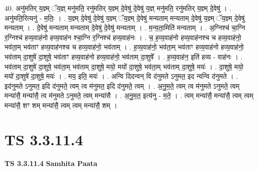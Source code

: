 \documentclass[17pt]{extarticle}
\begin{document}
40. अनु॑मतिर् य॒ज्ञ्म् ॅय॒ज्ञ् मनु॑मति॒ रनु॑मतिर् य॒ज्ञ्म् दे॒वेषु॑ दे॒वेषु॑ य॒ज्ञ् मनु॑मति॒ रनु॑मतिर् य॒ज्ञ्म् दे॒वेषु॑ । . अनु॑मति॒रित्यनु॑ - म॒तिः॒ । . य॒ज्ञ्म् दे॒वेषु॑ दे॒वेषु॑ य॒ज्ञ्म् ॅय॒ज्ञ्म् दे॒वेषु॑ मन्यताम् मन्यताम् दे॒वेषु॑ य॒ज्ञ्म् ॅय॒ज्ञ्म् दे॒वेषु॑ मन्यताम् । . दे॒वेषु॑ मन्यताम् मन्यताम् दे॒वेषु॑ दे॒वेषु॑ मन्यताम् । . म॒न्य॒ता॒मिति॑ मन्यताम् । . अ॒ग्निश्च॑ चा॒ग्नि र॒ग्निश्च॑ हव्य॒वाह॑नो हव्य॒वाह॑न श्चा॒ग्नि र॒ग्निश्च॑ हव्य॒वाह॑नः । . च॒ ह॒व्य॒वाह॑नो हव्य॒वाह॑नश्च च हव्य॒वाह॑नो॒ भव॑ता॒म् भव॑ताꣳ हव्य॒वाह॑नश्च च हव्य॒वाह॑नो॒ भव॑ताम् । . ह॒व्य॒वाह॑नो॒ भव॑ता॒म् भव॑ताꣳ हव्य॒वाह॑नो हव्य॒वाह॑नो॒ भव॑ताम् दा॒शुषे॑ दा॒शुषे॒ भव॑ताꣳ हव्य॒वाह॑नो हव्य॒वाह॑नो॒ भव॑ताम् दा॒शुषे᳚ । . ह॒व्य॒वाह॑न॒ इति॑ हव्य - वाह॑नः । . भव॑ताम् दा॒शुषे॑ दा॒शुषे॒ भव॑ता॒म् भव॑ताम् दा॒शुषे॒ मयो॒ मयो॑ दा॒शुषे॒ भव॑ता॒म् भव॑ताम् दा॒शुषे॒ मयः॑ । . दा॒शुषे॒ मयो॒ मयो॑ दा॒शुषे॑ दा॒शुषे॒ मयः॑ । . मय॒ इति॒ मयः॑ । . अन्वि दिदन्वन् वि द॑नुमते ऽनुमत॒ इद न्वन्वि द॑नुमते । . इद॑नुमते ऽनुमत॒ इदि द॑नुमते॒ त्वम् त्व म॑नुमत॒ इदि द॑नुमते॒ त्वम् । . अ॒नु॒म॒ते॒ त्वम् त्व म॑नुमते ऽनुमते॒ त्वम् मन्या॑सै॒ मन्या॑सै॒ त्व म॑नुमते ऽनुमते॒ त्वम् मन्या॑सै । . अ॒नु॒म॒त॒ इत्य॑नु - म॒ते॒ । . त्वम् मन्या॑सै॒ मन्या॑सै॒ त्वम् त्वम् मन्या॑सै॒ शꣳ शम् मन्या॑सै॒ त्वम् त्वम् मन्या॑सै॒ शम् । \newline
\pagebreak
{}

\section{ TS 3.3.11.4 }

\textbf{TS 3.3.11.4 } \newline
\textbf{Samhita Paata} \newline
\end{document}
